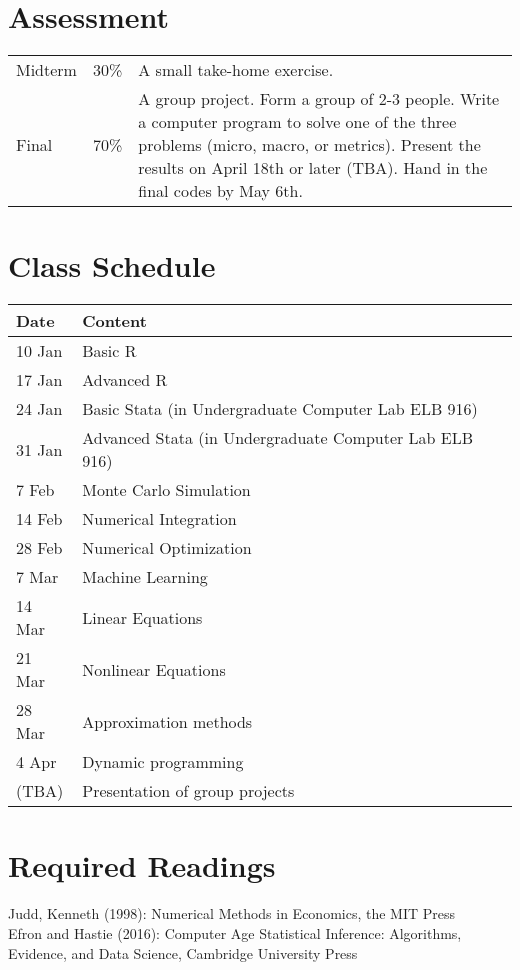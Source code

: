 \documentclass[11pt]{article}
\begin{document}
\section{Assessment}
\begin{tabular}{p{0.5in}p{0.5in}p{5in}}
   Midterm & 30\% & A small take-home exercise. \\
   Final  & 70\%  & A group project. Form a group of 2-3 people. Write a computer program to solve one of the three problems (micro, macro, or metrics). Present the results on April 18th or later (TBA). Hand in the final codes by May 6th.
\end{tabular}

\section{Class Schedule}
\begin{tabular}{p{1in}p{4in}}
  \hline
  Date & Content \\
  \hline
  10 Jan & Basic R \\
  17 Jan & Advanced R \\
  24 Jan & Basic Stata (in Undergraduate Computer Lab ELB 916) \\
  31 Jan & Advanced Stata (in Undergraduate Computer Lab ELB 916)  \\
  7 Feb &  Monte Carlo Simulation\\
  14 Feb & Numerical Integration \\
  28 Feb & Numerical Optimization  \\
  7 Mar &  Machine Learning  \\
  14 Mar & Linear Equations \\
  21 Mar & Nonlinear Equations \\
  28 Mar & Approximation methods \\
  4 Apr & Dynamic programming \\
  (TBA) & Presentation of group projects \\
  \hline
\end{tabular}





\section{Required Readings}
Judd, Kenneth (1998): Numerical Methods in Economics, the MIT Press \\
Efron and Hastie (2016): Computer Age Statistical Inference: Algorithms, Evidence, and Data Science, Cambridge University Press
\end{document}
